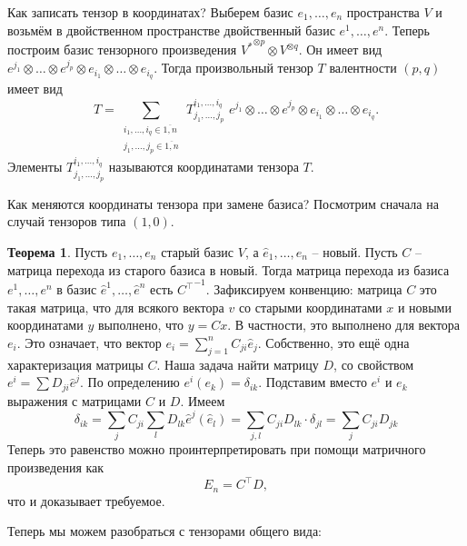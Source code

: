 \documentclass[10pt,a4paper,oneside]{book}
\theoremstyle{definition}
\newtheorem{thm}{{\color{red!40!black} Теорема}}
\newcommand{\ovl}{\overline}
\def\thrm{\begin{thm}}
\def\ethrm{\end{thm}}
\begin{document}
Как записать тензор в координатах? Выберем базис $e_1,\dots,e_n$ пространства $V$ и возьмём в двойственном пространстве двойственный базис $e^1,\dots,e^n$. Теперь построим базис тензорного произведения ${V^{*}}^{\otimes p}\otimes V^{\otimes q}$. Он имеет вид $e^{j_1}\otimes\dots\otimes e^{j_p}\otimes e_{i_1}\otimes \dots \otimes e_{i_q}$. Тогда произвольный тензор $T$ валентности $(p,q)$ имеет вид 
$$ T= \sum_{\substack{i_1,\dots,i_q \in \ovl{1,n}\\ j_1,\dots,j_p \in \ovl{1,n}} } \,T_{j_1,\dots,j_p}^{i_1,\dots,i_q}\,\, e^{j_1}\otimes\dots\otimes e^{j_p}\otimes e_{i_1}\otimes \dots \otimes e_{i_q}.$$
Элементы $T_{j_1,\dots,j_p}^{i_1,\dots,i_q}$ называются координатами тензора $T$.


Как меняются координаты тензора при замене базиса? Посмотрим сначала на случай тензоров типа $(1,0)$.

\thrm Пусть $e_1,\dots,e_n$ старый базис $V$, а $\hat{e}_1,\dots,\hat{e}_n$ -- новый. Пусть $C$ -- матрица перехода из старого базиса в новый. Тогда матрица перехода из базиса $e^1,\dots,e^n$ в базис $\hat{e}^1,\dots,\hat{e}^n$ есть ${C^{\top}}^{-1}$.
\proof Зафиксируем конвенцию: матрица $C$ это такая матрица, что для всякого вектора $v$ со старыми координатами $x$ и новыми координатами $y$ выполнено, что $y=Cx$. В частности, это выполнено для вектора $e_i$. Это означает, что вектор $e_i=\sum_{j=1}^nC_{ji}\hat{e}_j$. Собственно, это ещё одна характеризация матрицы $C$. Наша задача найти матрицу $D$, со свойством $e^i=\sum D_{ji}\hat{e}^j$. По определению $e^i(e_k)=\delta_{ik}$. Подставим вместо $e^i$ и $e_k$ выражения с матрицами $C$ и $D$. Имеем
$$\delta_{ik}=\sum_{j}C_{ji} \sum_{l}D_{lk}\hat{e}^j(\hat{e}_l)=\sum_{j,l}C_{ji}D_{lk}\cdot\delta_{jl}=\sum_{j}C_{ji}D_{jk}$$
Теперь это равенство можно проинтерпретировать при помощи матричного произведения как 
$$E_n=C^{\top}D,$$
что и доказывает требуемое.
\endproof
\ethrm

Теперь мы можем разобраться с тензорами общего вида:
\end{document}
